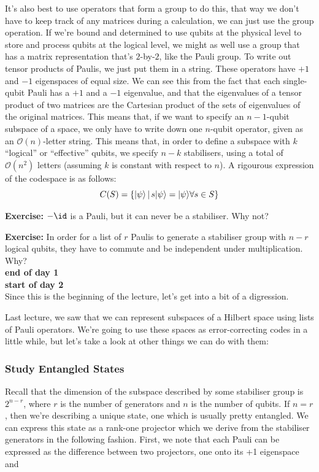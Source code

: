 \documentclass[10pt,a4paper, english]{scrartcl}
\begin{document}
It's also best to use operators that form a group to do this, that way we don't have to keep track of any matrices during a calculation, we can just use the group operation. 
If we're bound and determined to use qubits at the physical level to store and process qubits at the logical level, we might as well use a group that has a matrix representation that's $2$-by-$2$, like the Pauli group. 
To write out tensor products of Paulis, we just put them in a string. 
These operators have $+1$ and $-1$ eigenspaces of equal size.
We can see this from the fact that each single-qubit Pauli has a $+1$ and a $-1$ eigenvalue, and that the eigenvalues of a tensor product of two matrices are the Cartesian product of the sets of eigenvalues of the original matrices.  
This means that, if we want to specify an $n-1$-qubit subspace of a space, we only have to write down one $n$-qubit operator, given as an $\mathcal{O}(n)$-letter string. 
This means that, in order to define a subspace with $k$ ``logical'' or ``effective'' qubits, 
we specify $n-k$ stabilisers, using a total of $\mathcal{O}(n^2)$ letters (assuming $k$ is constant with respect to $n$).
A rigourous expression of the codespace is as follows:
\begin{equation}
C(S) = \left \lbrace {\left\vert{\psi}\right\rangle} \, \middle \vert \, s{\left\vert{\psi}\right\rangle}={\left\vert{\psi}\right\rangle} \forall s \in S \right \rbrace
\end{equation}

\textbf{Exercise: }$-\id$ is a Pauli, but it can never be a stabiliser. Why not?

\textbf{Exercise: }In order for a list of $r$ Paulis to generate a stabiliser group with $n-r$ logical qubits, they have to commute and be independent under multiplication. Why?\\
{\LARGE \textbf{end of day 1}}\\
{\LARGE \textbf{start of day 2}}\\
Since this is the beginning of the lecture, let's get into a bit of a digression. 

Last lecture, we saw that we can represent subspaces of a Hilbert space using lists of Pauli operators. 
We're going to use these spaces as error-correcting codes in a little while, but let's take a look at other things we can do with them:
\subsubsection{Study Entangled States}
Recall that the dimension of the subspace described by some stabiliser group is $2^{n-r}$, where $r$ is the number of generators and $n$ is the number of qubits. 
If $n=r$, then we're describing a unique state, one which is usually pretty entangled. 
We can express this state as a rank-one projector which we derive from the stabiliser generators in the following fashion. 
First, we note that each Pauli can be expressed as the difference between two projectors, one onto its +1 eigenspace and 
\end{document}
